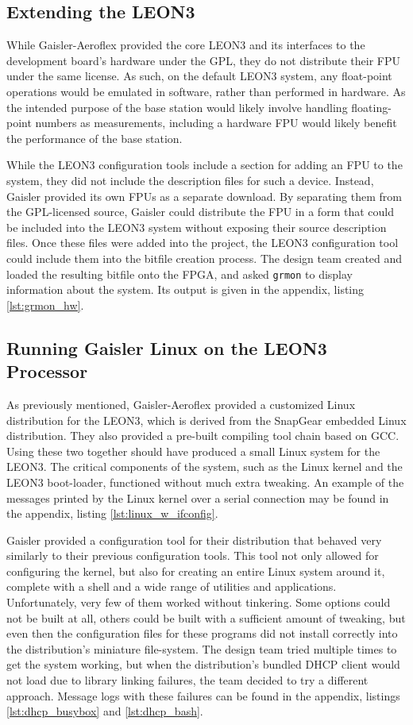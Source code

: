 \subsection{Extending the LEON3}
While Gaisler-Aeroflex provided the core LEON3 and its interfaces to
the development board's hardware under the \ac{GPL}, they do not distribute
their \ac{FPU} under the same license. As such, on the default LEON3 system,
any float-point operations would be emulated in software, rather than
performed in hardware. As the intended purpose of the base station would
likely involve handling floating-point numbers as measurements, including a
hardware \ac{FPU} would likely benefit the performance of the base station.

While the LEON3 configuration tools include a section for adding an
\ac{FPU} to the system, they did not include the description files for such
a device. Instead, Gaisler provided its own \ac{FPU}s as a separate
download. By separating them from the \ac{GPL}-licensed source, Gaisler
could distribute the \ac{FPU} in a form that could be included into the
LEON3 system without exposing their source description files. Once these
files were added into the project, the LEON3 configuration tool could
include them into the bitfile creation process. The design team created and
loaded the resulting bitfile onto the \ac{FPGA}, and asked \texttt{grmon}
to display information about the system. Its output is given in the
appendix, listing \ref{lst:grmon_hw}.

\subsection{Running Gaisler Linux on the LEON3 Processor}
As previously mentioned, Gaisler-Aeroflex provided a customized Linux
distribution for the LEON3, which is derived from the SnapGear embedded
Linux distribution. They also provided a pre-built compiling tool chain
based on \ac{GCC}. Using these two together should have produced a small
Linux system for the LEON3. The critical components of the system, such as
the Linux kernel and the LEON3 boot-loader, functioned without much extra
tweaking. An example of the messages printed by the Linux kernel over a
serial connection may be found in the appendix, listing
\ref{lst:linux_w_ifconfig}.

Gaisler provided a configuration tool for their distribution that behaved
very similarly to their previous configuration tools. This tool not only
allowed for configuring the kernel, but also for creating an entire Linux
system around it, complete with a shell and a wide range of utilities and
applications. Unfortunately, very few of them worked without
tinkering. Some options could not be built at all, others could be built
with a sufficient amount of tweaking, but even then the configuration files
for these programs did not install correctly into the distribution's
miniature file-system. The design team tried multiple times to get the
system working, but when the distribution's bundled \ac{DHCP} client would
not load due to library linking failures, the team decided to try a
different approach. Message logs with these failures can be found in the
appendix, listings \ref{lst:dhcp_busybox} and \ref{lst:dhcp_bash}.

